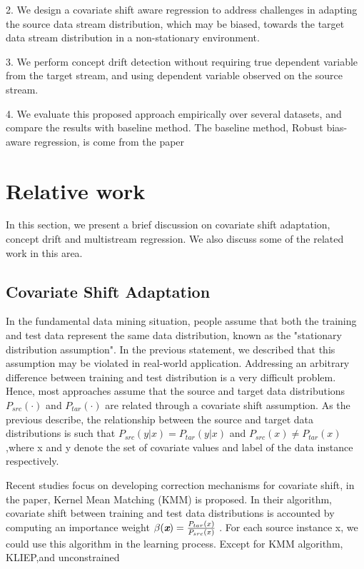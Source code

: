   2. We design a covariate shift aware regression to address challenges in adapting the source data stream distribution, which may be biased, towards the target data stream distribution in a non-stationary environment. 
  
  3. We perform concept drift detection without requiring true dependent variable from the target stream, and using dependent variable observed on the source stream. 
  
  4. We evaluate this proposed approach empirically over several datasets, and compare the results with baseline method. The baseline method, Robust bias-aware regression, is come from the paper\cite{chen}

\section{Relative work}
\label{notations}
In this section, we present a brief discussion on covariate shift adaptation, concept drift and multistream regression. We also discuss some of the related work in this area.

\subsection{Covariate Shift Adaptation}
\label{notations}
In the fundamental data mining situation, people assume that both the training and test data represent
the same data distribution, known as the "stationary
distribution assumption". In the previous statement, we described that this assumption may be violated in real-world application. Addressing an arbitrary difference between training and test distribution is a very difficult problem\cite{Huang}. Hence, most approaches assume that the source and target data distributions $P_{src}(\cdot)$ and $P_{tar}(\cdot)$ are related through a covariate shift assumption. As the previous describe, the relationship
between the source and target data distributions is such that $P_{src}(y \vert {x}) = P_{tar}(y \vert {x})$ and $P_{src}(x) \ne P_{tar}(x)$,where x and y denote the
set of covariate values and label of the data instance respectively.

Recent studies focus on developing correction mechanisms for covariate shift, in the 
paper\cite{Huang}, Kernel Mean Matching (KMM) is proposed. In their algorithm, 
covariate shift between training and test data distributions is accounted by 
computing an importance weight $\beta(\textit{\textbf{x}}) = \frac{P_{tar}({x})}
{P_{src}({x})}$ . For each source instance x, we could use this algorithm in the 
learning process. Except for KMM algorithm, KLIEP\cite{sugiyama},and unconstrained

